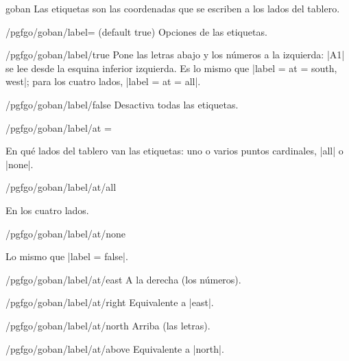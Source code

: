 \begin{environment}{{goban}}
	Las etiquetas son las coordenadas que se escriben a los lados del tablero.
	
	\begin{key}{/pgfgo/goban/label= (default true)}
		Opciones de las etiquetas.
	\end{key}
	
	\begin{key}{/pgfgo/goban/label/true}
		Pone las letras abajo y los números a la izquierda: |A1| se lee desde la esquina inferior izquierda. Es lo mismo que |label = {at = {south, west}}|; para los cuatro lados, |label = {at = all}|.

		\begin{codeexample}[]
			\begin{goban}[5, label]
			\end{goban}
		\end{codeexample}
	\end{key}

	\begin{key}{/pgfgo/goban/label/false}
		Desactiva todas las etiquetas.
	\end{key}
	
	\begin{key}{/pgfgo/goban/label/at =}
		
		En qué lados del tablero van las etiquetas: uno o varios puntos cardinales, |all| o |none|.
		
		\begin{stylekey}{/pgfgo/goban/label/at/all}
			
			En los cuatro lados.
		\end{stylekey}
		
		\begin{stylekey}{/pgfgo/goban/label/at/none}
			
			Lo mismo que |label = false|.
		\end{stylekey}
		
		\begin{stylekey}{/pgfgo/goban/label/at/east}
			A la derecha (los números).
		\end{stylekey}
		\begin{stylekey}{/pgfgo/goban/label/at/right}
			Equivalente a |east|.
		\end{stylekey}
		
		\begin{stylekey}{/pgfgo/goban/label/at/north}
			Arriba (las letras).
		\end{stylekey}
		\begin{stylekey}{/pgfgo/goban/label/at/above}
			Equivalente a |north|.
		\end{stylekey}
		

\end{key}
\end{environment}
